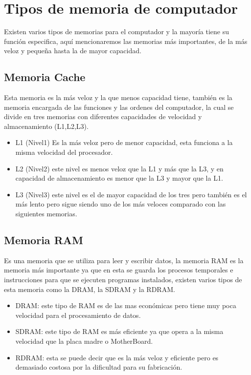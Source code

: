 \documentclass{article}
\begin{document}
	\section{Tipos de memoria de computador} \label{contenido}
	Existen varios tipos de memorias para el computador y la mayoría tiene su función especifica, aquí mencionaremos las memorias más importantes, de la más veloz y pequeña hasta la de mayor capacidad.
	\subsection{Memoria Cache}
	Esta memoria es la más veloz y la que menos capacidad tiene, también es la memoria encargada de las funciones y las ordenes del computador, la cual se divide en tres memorias con diferentes capacidades de velocidad y almacenamiento  (L1,L2,L3).
	\begin{itemize}
		\item{L1 (Nivel1) Es la más veloz pero de menor capacidad, esta funciona a la misma velocidad del procesador.}
		\item{L2 (Nivel2) este nivel es menos veloz que la L1 y más que la L3, y en capacidad de almacenamiento es menor que la L3 y mayor que la L1.}
		\item {L3 (Nivel3) este nivel es el de mayor capacidad de los tres pero también es el más lento pero sigue siendo uno de los más veloces comparado con las siguientes memorias.}
	\end{itemize}
	
	\subsection{Memoria RAM}
	Es una memoria que se utiliza para leer y escribir datos, la memoria RAM es la memoria más importante ya que en esta se guarda los procesos temporales e instrucciones para que se ejecuten programas instalados, existen varios tipos de esta memoria como la DRAM, la SDRAM y la RDRAM.\cite{ram}
	\begin{itemize}
		\item{DRAM:}
		este tipo de RAM es de las mas económicas pero tiene muy poca velocidad para el procesamiento de datos.   
		
		\item{SDRAM:}
		este tipo de RAM es más eficiente ya que opera a la misma velocidad que la placa madre o MotherBoard.
		
		\item{RDRAM:}
		esta se puede decir que es la más veloz y eficiente pero es demasiado costosa por la dificultad para su fabricación.
	\end{itemize}
	
\end{document}
